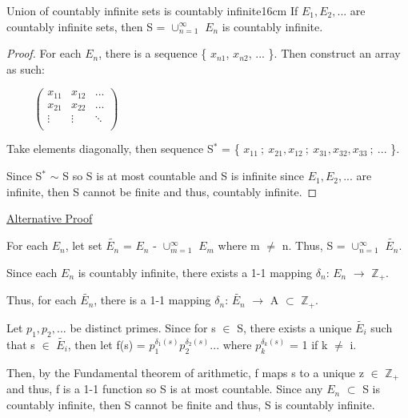 	\begin{wtheorem}{Union of countably infinite sets is countably infinite}{16cm}
		If $E_1, E_2, ... $ are countably infinite sets, then S = $\cup_{n=1}^{\infty}$ $E_n$
		is countably infinite.		
	\end{wtheorem}
	
	\begin{proof}
		For each $E_n$, there is a sequence \{ $x_{n1}$, $x_{n2}$, ... \}.
		Then construct an array as such:

		{\small $ \hspace{1cm}
		\left(
		\begin{array}{ccc}
			x_{11} & x_{12} & ... \\
			x_{21} & x_{22} & ... \\
			\vdots & \vdots & \ddots \\
		\end{array}
		\right)
		$}
			
		Take elements diagonally, then sequence S$^*$ =
		\{ $x_{11} \ ; \ x_{21}, x_{12} \ ; \ x_{31}, x_{32}, x_{33} \ ; \ ... $ \}.
			
		Since S$^*$ $\sim$ S so S is at most countable and S is infinite since
		$E_1, E_2, ...$ are infinite, then S cannot be finite and
		thus, countably infinite.
	\end{proof}

	\vspace{0.1cm}

	{ \color{magenta} \underline{Alternative Proof} }

	\begin{tbox}
		For each $E_n$, let set $\widetilde{E_n}$ = $E_n$ - $\cup_{m=1}^{\infty}$
		$E_m$ where m $\neq$ n. Thus, S = $\cup_{n=1}^{\infty}$ $\widetilde{E_n}$.

		Since each $E_n$ is countably infinite, there exists a 1-1 mapping
		$\delta_n$: $E_n$ $\rightarrow$ $\mathbb{Z}_+$.

		Thus, for each $\widetilde{E_n}$, there is a 1-1 mapping
		$\delta_n$: $\widetilde{E_n}$ $\rightarrow$ A $\subset$ $\mathbb{Z}_+$.

		Let $p_1, p_2, ... $ be distinct primes.
		Since for s $\in$ S, there exists a unique $\widetilde{E_i}$ such that
		s $\in$ $\widetilde{E_i}$, then let f(s) = $p_1^{\delta_1(s)}
		p_2^{\delta_2(s)}...$ where $p_k^{\delta_k(s)}$ = 1 if k $\neq$ i.

		Then, by the Fundamental theorem of arithmetic, f maps s to a unique
		z $\in$ $\mathbb{Z}_+$ and thus, f is a 1-1 function so S is at most countable.
		Since any $E_n$ $\subset$ S is countably infinite, then S cannot be finite
		and thus, S is countably infinite.
	\end{tbox}



